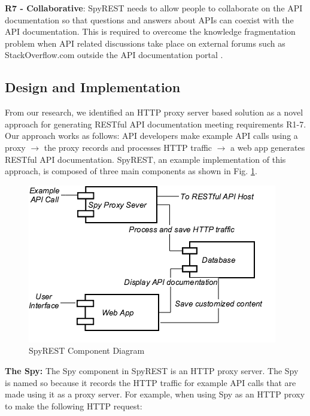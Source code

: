 \documentclass[conference]{IEEEtran}
\begin{document}
  \textbf{R7 - Collaborative}: SpyREST needs to allow people to collaborate on the API documentation so that questions and answers about APIs can coexist with the API documentation. This is required to overcome the knowledge fragmentation problem when API related discussions take place on external forums such as StackOverflow.com outside the API documentation portal \cite{Chen_who_asked}.


\subsection{Design and Implementation} %
From our research, we identified an HTTP proxy server based solution as a novel approach for generating RESTful API documentation meeting requirements R1-7. Our approach works as follows: API developers make example API calls using a proxy $\longrightarrow$ the proxy records and processes HTTP traffic $\longrightarrow$ a web app generates RESTful API documentation. SpyREST, an example implementation of this approach, is composed of three main components as shown in Fig. \ref{fig:components}.

\begin{figure}[htb]
  \centering
  \includegraphics[width=\linewidth]{spyrest_components.png}
  \caption{SpyREST Component Diagram}
  \label{fig:components}
\end{figure}


% 

\textbf{The Spy:} The Spy component in SpyREST is an HTTP proxy server. The Spy is named so because it records the HTTP traffic for example API calls that are made using it as a proxy server. For example, when using Spy as an HTTP proxy to make the following HTTP request:
\end{document}
